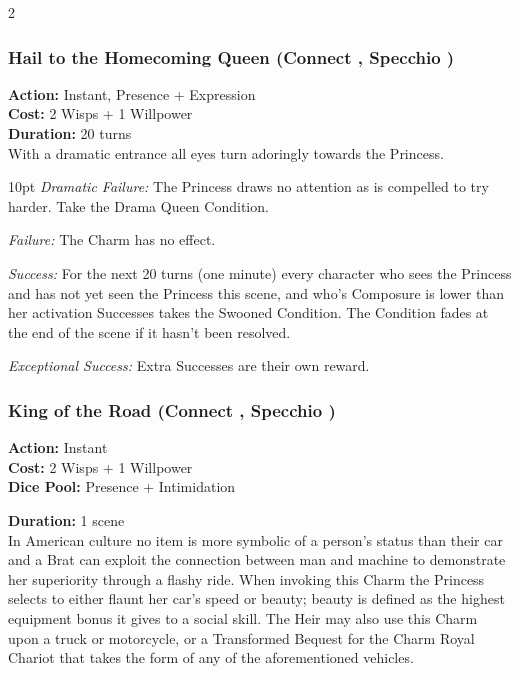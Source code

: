 \begin{multicols}{2}
\subsubsection*{Hail to the Homecoming Queen (Connect \textbullet\textbullet, Specchio \textbullet\textbullet\textbullet)}

\noindent \textbf{Action:} Instant, Presence + Expression \\

\noindent \textbf{Cost:} 2 Wisps + 1 Willpower \\ 

\noindent \textbf{Duration:} 20 turns  \\

\noindent With a dramatic entrance all eyes turn adoringly towards the Princess. 

\begin{myindentpar}{10pt} \emph{Dramatic Failure:} The Princess draws no attention as is compelled to try harder. Take the Drama Queen Condition. 
   
    \emph{Failure:} The Charm has no effect.
	
    \emph{Success:} For the next 20 turns (one minute) every character who sees the Princess and has not yet seen the Princess this scene, and who's Composure is lower than her activation Successes takes the Swooned Condition. The Condition fades at the end of the scene if it hasn't been resolved. 
	
    \emph{Exceptional Success:} Extra Successes are their own reward.\end{myindentpar}
	
\subsubsection*{King of the Road (Connect \textbullet\textbullet, Specchio \textbullet\textbullet\textbullet)}

\noindent \textbf{Action:} Instant\\

\noindent \textbf{Cost:} 2 Wisps + 1 Willpower \\ 

\noindent \textbf{Dice Pool:} Presence + Intimidation

\noindent \textbf{Duration:} 1 scene  \\

\noindent In American culture no item is more symbolic of a person's status than their car and a Brat can exploit the connection between man and machine to demonstrate her superiority through a flashy ride. When invoking this Charm the Princess selects to either flaunt her car's speed or beauty; beauty is defined as the highest equipment bonus it gives to a social skill. The Heir may also use this Charm upon a truck or motorcycle, or a Transformed Bequest for the Charm Royal Chariot that takes the form of any of the aforementioned vehicles.


\end{multicols}

